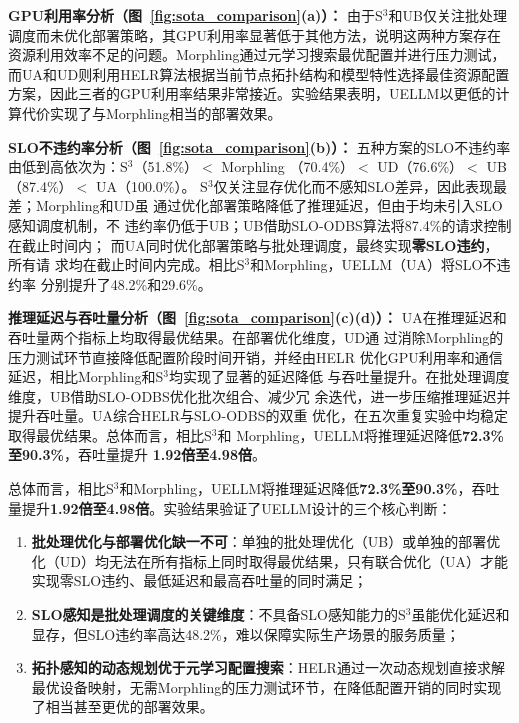 \textbf{GPU利用率分析（图~\ref{fig:sota_comparison}(a)）：}
由于S$^3$和UB仅关注批处理调度而未优化部署策略，其GPU利用率显著低于其他方法，说明这两种方案存在资源利用效率不足的问题。Morphling通过元学习搜索最优配置并进行压力测试，而UA和UD则利用HELR算法根据当前节点拓扑结构和模型特性选择最佳资源配置方案，因此三者的GPU利用率结果非常接近。实验结果表明，UELLM以更低的计算代价实现了与Morphling相当的部署效果。

\textbf{SLO不违约率分析（图~\ref{fig:sota_comparison}(b)）：}
五种方案的SLO不违约率由低到高依次为：S$^3$（51.8\%）$<$ Morphling
（70.4\%）$<$ UD（76.6\%）$<$ UB（87.4\%）$<$ UA（100.0\%）。
S$^3$仅关注显存优化而不感知SLO差异，因此表现最差；Morphling和UD虽
通过优化部署策略降低了推理延迟，但由于均未引入SLO感知调度机制，不
违约率仍低于UB；UB借助SLO-ODBS算法将87.4\%的请求控制在截止时间内；
而UA同时优化部署策略与批处理调度，最终实现\textbf{零SLO违约}，所有请
求均在截止时间内完成。相比S$^3$和Morphling，UELLM（UA）将SLO不违约率
分别提升了48.2\%和29.6\%。

\textbf{推理延迟与吞吐量分析（图~\ref{fig:sota_comparison}(c)(d)）：}
UA在推理延迟和吞吐量两个指标上均取得最优结果。在部署优化维度，UD通
过消除Morphling的压力测试环节直接降低配置阶段时间开销，并经由HELR
优化GPU利用率和通信延迟，相比Morphling和S$^3$均实现了显著的延迟降低
与吞吐量提升。在批处理调度维度，UB借助SLO-ODBS优化批次组合、减少冗
余迭代，进一步压缩推理延迟并提升吞吐量。UA综合HELR与SLO-ODBS的双重
优化，在五次重复实验中均稳定取得最优结果。总体而言，相比S$^3$和
Morphling，UELLM将推理延迟降低\textbf{72.3\%至90.3\%}，吞吐量提升
\textbf{1.92倍至4.98倍}\cite{he2024uellm}。

总体而言，相比S$^3$和Morphling，UELLM将推理延迟降低\textbf{72.3\%至90.3\%}，吞吐量提升\textbf{1.92倍至4.98倍}\cite{he2024uellm}。实验结果验证了UELLM设计的三个核心判断：
\begin{enumerate}
    \item \textbf{批处理优化与部署优化缺一不可}：单独的批处理优化（UB）或单独的部署优化（UD）均无法在所有指标上同时取得最优结果，只有联合优化（UA）才能实现零SLO违约、最低延迟和最高吞吐量的同时满足；
    \item \textbf{SLO感知是批处理调度的关键维度}：不具备SLO感知能力的S$^3$虽能优化延迟和显存，但SLO违约率高达48.2\%，难以保障实际生产场景的服务质量；
    \item \textbf{拓扑感知的动态规划优于元学习配置搜索}：HELR通过一次动态规划直接求解最优设备映射，无需Morphling的压力测试环节，在降低配置开销的同时实现了相当甚至更优的部署效果。
\end{enumerate}

